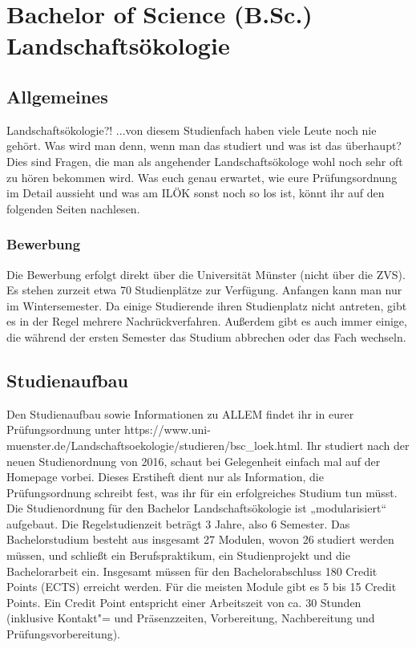 \chapter{Bachelor of Science (B.Sc.) Landschaftsökologie}

\section{Allgemeines}
Landschaftsökologie?! ...von diesem Studienfach haben viele Leute noch nie gehört. Was wird man denn, wenn man das studiert und was ist das überhaupt? Dies sind Fragen, die man als angehender Landschaftsökologe wohl noch sehr oft zu hören bekommen wird. Was euch genau erwartet, wie eure Prüfungsordnung im Detail aussieht und was am ILÖK sonst noch so los ist, könnt ihr auf den folgenden Seiten nachlesen.

\subsection*{Bewerbung}
Die Bewerbung erfolgt direkt über die Universität Münster (nicht über die ZVS). Es stehen zurzeit etwa 70 Studienplätze zur Verfügung. Anfangen kann man nur im Wintersemester. Da einige Studierende ihren Studienplatz nicht antreten, gibt es in der Regel mehrere Nachrückverfahren. Außerdem gibt es auch immer einige, die während der ersten Semester das Studium abbrechen oder das Fach wechseln.

\section{Studienaufbau}
Den Studienaufbau sowie Informationen zu ALLEM findet ihr in eurer Prüfungsordnung unter https://www.uni-muenster.de/Landschaftsoekologie/studieren/bsc_loek.html. Ihr studiert nach der neuen Studienordnung von 2016, schaut bei Gelegenheit einfach mal auf der Homepage vorbei. Dieses Erstiheft dient nur als Information, die Prüfungsordnung schreibt fest, was ihr für ein erfolgreiches Studium tun müsst. 
Die Studienordnung für den Bachelor Landschaftsökologie ist „modularisiert“ aufgebaut. Die Regelstudienzeit beträgt 3 Jahre, also 6 Semester. Das Bachelorstudium besteht aus insgesamt 27 Modulen, wovon 26 studiert werden müssen, und schließt ein Berufspraktikum, ein Studienprojekt und die Bachelorarbeit ein. Insgesamt müssen für den Bachelorabschluss 180 Credit Points (ECTS) erreicht werden. Für die meisten Module gibt es 5 bis 15 Credit Points. Ein Credit Point entspricht einer Arbeitszeit von ca. 30 Stunden (inklusive Kontakt"= und Präsenzzeiten, Vorbereitung, Nachbereitung und Prüfungsvorbereitung). 

